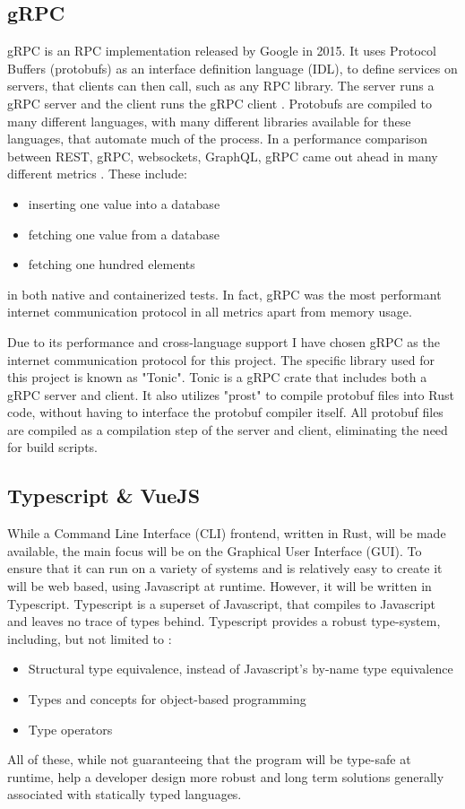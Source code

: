 \subsection{gRPC} \label{sec:chap3:technology:grpc}
gRPC is an RPC implementation released by Google in 2015. It uses Protocol Buffers (protobufs) as an interface definition language (IDL), to define services on servers, that clients can then call, such as any RPC library. The server runs a gRPC server and the client runs the gRPC client \cite{grpcHomepage}. Protobufs are compiled to many different languages, with many different libraries available for these languages, that automate much of the process. In a performance comparison between REST, gRPC, websockets, GraphQL, gRPC came out ahead in many different metrics \cite{reviewOfInternetProtocols}. These include: 
\begin{itemize}
    \item inserting one value into a database
    \item fetching one value from a database 
    \item fetching one hundred elements  
\end{itemize}
in both native and containerized tests. In fact, gRPC was the most performant internet communication protocol in all metrics apart from memory usage.

Due to its performance and cross-language support I have chosen gRPC as the internet communication protocol for this project. The specific library used for this project is known as "Tonic". Tonic is a gRPC crate that includes both a gRPC server and client. It also utilizes "prost" to compile protobuf files into Rust code, without having to interface the protobuf compiler itself. All protobuf files are compiled as a compilation step of the server and client, eliminating the need for build scripts.

\subsection{Typescript \& VueJS} \label{sec:chap3:technology:ts}
While a Command Line Interface (CLI) frontend, written in Rust, will be made available, the main focus will be on the Graphical User Interface (GUI). To ensure that it can run on a variety of systems and is relatively easy to create it will be web based, using Javascript at runtime. However, it will be written in Typescript. Typescript is a superset of Javascript, that compiles to Javascript and leaves no trace of types behind. Typescript provides a robust type-system, including, but not limited to \cite{understandingTypescript}:
\begin{itemize}
    \item Structural type equivalence, instead of Javascript's by-name type equivalence
    \item Types and concepts for object-based programming
    \item Type operators
\end{itemize}
All of these, while not guaranteeing that the program will be type-safe at runtime, help a developer design more robust and long term solutions generally associated with statically typed languages.

